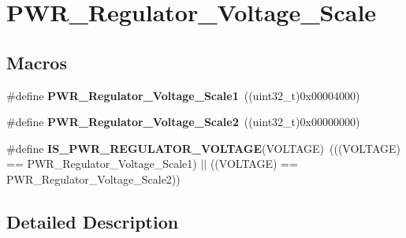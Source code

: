 \hypertarget{group___p_w_r___regulator___voltage___scale}{\section{P\-W\-R\-\_\-\-Regulator\-\_\-\-Voltage\-\_\-\-Scale}
\label{group___p_w_r___regulator___voltage___scale}
}
\subsection*{Macros}
\begin{DoxyCompactItemize}
\item 
\hypertarget{group___p_w_r___regulator___voltage___scale_ga3626811fd793b5f5cf9d510acfcbffc4}{\#define {\bfseries P\-W\-R\-\_\-\-Regulator\-\_\-\-Voltage\-\_\-\-Scale1}~((uint32\-\_\-t)0x00004000)}\label{group___p_w_r___regulator___voltage___scale_ga3626811fd793b5f5cf9d510acfcbffc4}

\item 
\hypertarget{group___p_w_r___regulator___voltage___scale_ga93ae6faf954e9478cf719f9b05c9cba8}{\#define {\bfseries P\-W\-R\-\_\-\-Regulator\-\_\-\-Voltage\-\_\-\-Scale2}~((uint32\-\_\-t)0x00000000)}\label{group___p_w_r___regulator___voltage___scale_ga93ae6faf954e9478cf719f9b05c9cba8}

\item 
\hypertarget{group___p_w_r___regulator___voltage___scale_gab7f9039ed34cc5af3d57606c726e66a2}{\#define {\bfseries I\-S\-\_\-\-P\-W\-R\-\_\-\-R\-E\-G\-U\-L\-A\-T\-O\-R\-\_\-\-V\-O\-L\-T\-A\-G\-E}(V\-O\-L\-T\-A\-G\-E)~(((V\-O\-L\-T\-A\-G\-E) == P\-W\-R\-\_\-\-Regulator\-\_\-\-Voltage\-\_\-\-Scale1) $|$$|$ ((V\-O\-L\-T\-A\-G\-E) == P\-W\-R\-\_\-\-Regulator\-\_\-\-Voltage\-\_\-\-Scale2))}\label{group___p_w_r___regulator___voltage___scale_gab7f9039ed34cc5af3d57606c726e66a2}

\end{DoxyCompactItemize}


\subsection{Detailed Description}
